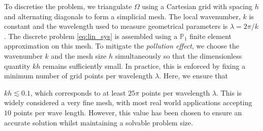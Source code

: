 \documentclass[preprint,3p,times]{elsarticle}
\theoremstyle{definition}
\numberwithin{equation}{section}
\begin{document}
To discretise the problem, we triangulate $\Omega$ using a Cartesian grid with spacing $h$ and alternating diagonals to form a simplicial mesh. The local wavenumber, $k$ is constant and the wavelength used to measure geometrical parameters is \(\lambda=2\pi/k\). The discrete problem \eqref{eq:lin_sys} is assembled using a $\mathbb{P}_1$ finite element approximation on this mesh.   To mitigate the \emph{pollution effect}, we choose the wavenumber $k$ and the mesh size $h$ simultaneously so that the dimensionless quantity $k h$ remains sufficiently small.  
In practice, this is enforced by fixing a minimum number of grid points per wavelength $\lambda$. Here, we ensure that { 
$k h \lesssim 0.1$, which corresponds to at least $25 \pi$ points per wavelength $\lambda$. This is widely considered a very fine mesh, with most real world applications accepting $10$ points per wave length. However, this value has been chosen to ensure an accurate solution whilst maintaining a solvable problem size. 

}
\end{document}
